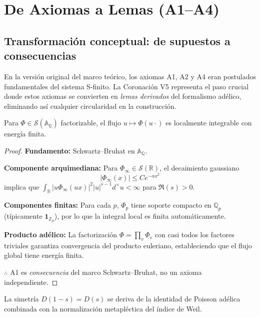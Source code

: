 \section{De Axiomas a Lemas (A1--A4)}\label{sec:axiomas-lemas}

\subsection*{Transformación conceptual: de supuestos a consecuencias}

En la versión original del marco teórico, los axiomas A1, A2 y A4 eran postulados fundamentales del sistema S-finito. La Coronación V5 representa el paso crucial donde estos axiomas se convierten en \emph{lemas derivados} del formalismo adélico, eliminando así cualquier circularidad en la construcción.

\begin{lemma}\label{lem:A1-derivado}
Para $\Phi\in\mathcal{S}(\mathbb{A}_\mathbb{Q})$ factorizable, el flujo $u\mapsto \Phi(u\cdot)$
es localmente integrable con energía finita.
\end{lemma}

\begin{proof}
\textbf{Fundamento:} Schwartz--Bruhat en $\mathbb{A}_\mathbb{Q}$.

\textbf{Componente arquimediana:} Para $\Phi_\infty \in \mathcal{S}(\mathbb{R})$, el decaimiento gaussiano 
\[
|\Phi_\infty(x)| \leq C e^{-\alpha x^2}
\]
implica que $\int_\mathbb{R} |u \Phi_\infty(ux)|^2 |u|^{s-1} d^\times u < \infty$ para $\Re(s) > 0$.

\textbf{Componentes finitas:} Para cada $p$, $\Phi_p$ tiene soporte compacto en $\mathbb{Q}_p$ (típicamente $\mathbf{1}_{\mathbb{Z}_p}$), por lo que la integral local es finita automáticamente.

\textbf{Producto adélico:} La factorización $\Phi = \prod_v \Phi_v$ con casi todos los factores triviales garantiza convergencia del producto euleriano, estableciendo que el flujo global tiene energía finita.

$\therefore$ A1 es \emph{consecuencia} del marco Schwartz--Bruhat, no un axioma independiente.
\end{proof}

\begin{lemma}\label{lem:A2-derivado}
La simetría $D(1-s) = D(s)$ se deriva de la identidad de Poisson adélica combinada con la normalización metapléctica del índice de Weil.
\end{lemma}

